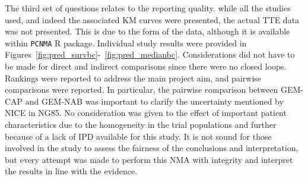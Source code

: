 The third set of questions relates to the reporting quality. while all the studies used, and indeed the associated KM curves were presented, the actual TTE data was not presented. This is due to the form of the data, although it is available within \verb|PCNMA| R package. Individual study results were provided in Figures~\ref{fig:pred_survbc}-~\ref{fig:pred_medianbc}. Considerations did not have to be made for direct and indirect comparisons since there were no closed loops. Rankings were reported to address the main project aim, and pairwise comparisons were reported. In particular, the pairwise comparison between GEM-CAP and GEM-NAB was important to clarify the uncertainty mentioned by NICE in NG85. No consideration was given to the effect of important patient characteristics due to the homogeneity in the trial populations and further because of a lack of IPD available for this study. It is not sound for those involved in the study to assess the fairness of the conclusions and interpretation, but every attempt was made to perform this NMA with integrity and interpret the results in line with the evidence. \\

